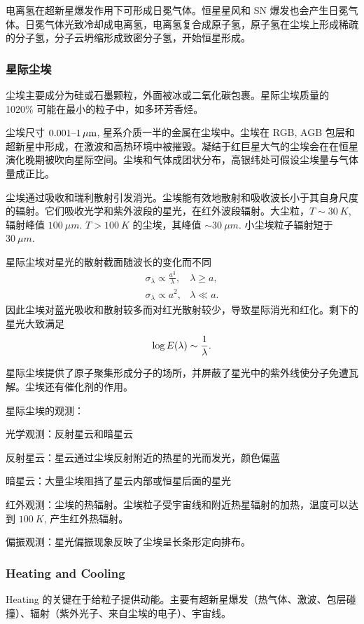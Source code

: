 \documentclass[../天体物理基础.tex]{subfiles}
\begin{document}
电离氢在超新星爆发作用下可形成日冕气体。恒星星风和 SN 爆发也会产生日冕气体。日冕气体光致冷却成电离氢，电离氢复合成原子氢，原子氢在尘埃上形成稀疏的分子氢，分子云坍缩形成致密分子氢，开始恒星形成。

\subsubsection{星际尘埃}
尘埃主要成分为硅或石墨颗粒，外面被冰或二氧化碳包裹。星际尘埃质量的 10\text{\textendash}20\% 可能在最小的粒子中，如多环芳香烃。

尘埃尺寸 $0.001\text{\textendash}\qty{1}{\mu m}$, 星系介质一半的金属在尘埃中。尘埃在 RGB, AGB 包层和超新星中形成，在激波和高热环境中被摧毁。凝结于红巨星大气的尘埃会在在恒星演化晚期被吹向星际空间。尘埃和气体成团状分布，高银纬处可假设尘埃量与气体量成正比。

尘埃通过吸收和瑞利散射引发消光。尘埃能有效地散射和吸收波长小于其自身尺度的辐射。它们吸收光学和紫外波段的星光，在红外波段辐射。大尘粒，$T\sim\qty{30}{K}$, 辐射峰值 $\qty{100}{\mu m}$. $T>\qty{100}{K}$ 的尘埃，其峰值 $\sim\qty{30}{\mu m}$. 小尘埃粒子辐射短于 $\qty{30}{\mu m}$.

星际尘埃对星光的散射截面随波长的变化而不同
\begin{align}
\sigma_{\lambda}\propto\frac{a^{3}}{\lambda},&\lambda\ge a,\\
\sigma_{\lambda}\propto{}a^{2},&\lambda\ll a.
\end{align}
因此尘埃对蓝光吸收和散射较多而对红光散射较少，导致星际消光和红化。剩下的星光大致满足
\begin{equation}
\log E\mleft(\lambda\mright)\sim\frac{1}{\lambda}.
\end{equation}

星际尘埃提供了原子聚集形成分子的场所，并屏蔽了星光中的紫外线使分子免遭瓦解。尘埃还有催化剂的作用。

星际尘埃的观测：

光学观测：反射星云和暗星云

反射星云：星云通过尘埃反射附近的热星的光而发光，颜色偏蓝

暗星云：大量尘埃阻挡了星云内部或恒星后面的星光

红外观测：尘埃的热辐射。尘埃粒子受宇宙线和附近热星辐射的加热，温度可以达到 $\qty{100}{K}$, 产生红外热辐射。

偏振观测：星光偏振现象反映了尘埃呈长条形定向排布。

\subsubsection{Heating and Cooling}
Heating 的关键在于给粒子提供动能。主要有超新星爆发（热气体、激波、包层碰撞）、辐射（紫外光子、来自尘埃的电子）、宇宙线。
\end{document}

